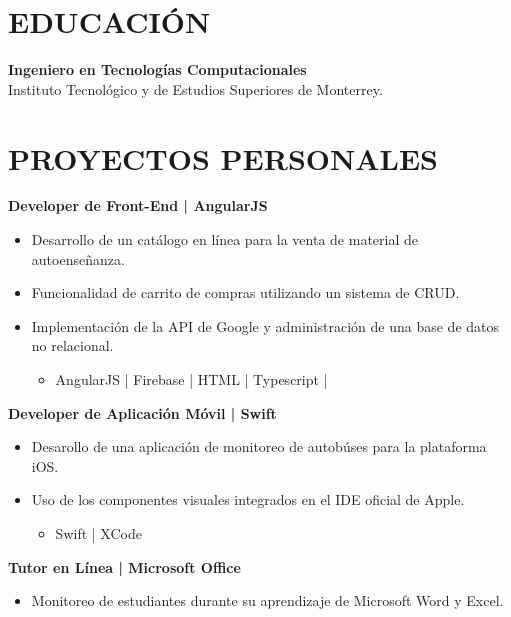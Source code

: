 \documentclass{res}
\begin{document}
\address{
}

\begin{resume}
    \separator

    \section{\large{EDUCACIÓN}} \jump\jump
    \textbf{Ingeniero en Tecnologías Computacionales} \jump
     \\
    Instituto Tecnológico y de Estudios Superiores de Monterrey.
    
    \longjump

    \section{\large{PROYECTOS PERSONALES}} \jump\jump
    \textbf{Developer de Front-End | AngularJS} \jump
    \begin{itemize}
        \item Desarrollo de un catálogo en línea para la venta de material de autoenseñanza.
        \item Funcionalidad de carrito de compras utilizando un sistema de CRUD.
        \item Implementación de la API de Google y administración de una base de datos no relacional.
        \begin{itemize}
            \item AngularJS | Firebase | HTML | Typescript |
        \end{itemize}
    \end{itemize}
    
    \textbf{Developer de Aplicación Móvil | Swift} \jump
    \begin{itemize}
        \item Desarollo de una aplicación de monitoreo de autobúses para la plataforma iOS.
        \item Uso de los componentes visuales integrados en el IDE oficial de Apple.
        \begin{itemize}
            \item Swift | XCode 
        \end{itemize}
    \end{itemize}

    \textbf{Tutor en Línea | Microsoft Office} \jump
    \begin{itemize}
        \item Monitoreo de estudiantes durante su aprendizaje de Microsoft Word y Excel.
    \end{itemize}
\end{resume}
\end{document}
